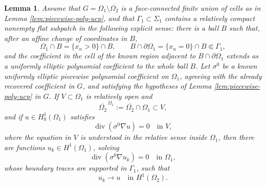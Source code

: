 \documentclass[11pt,oneside]{article}
\newtheorem{lemma}[theorem]{Lemma}
\newcommand{\diver}{\operatorname{div}}
\begin{document}
\begin{lemma}
\label{lem:runge-known-shell}
Assume that \(G=\Omega_1\setminus\overline{\Omega_2}\) is a face-connected
finite union of cells as in Lemma \ref{lem:piecewise-poly-ucp}, and that
\(\Gamma_1\subset\Sigma_1\) contains a relatively compact nonempty flat
subpatch in the following explicit sense: there is a ball \(B\) such that,
after an affine change of coordinates in \(B\),
\begin{equation}
  \Omega_1\cap B=\{x_n>0\}\cap B,
  \qquad
  B\cap\partial\Omega_1=\{x_n=0\}\cap B\Subset \Gamma_1,
\end{equation}
and the coefficient in the cell of the known region adjacent to \(B\cap\partial\Omega_1\)
extends as a uniformly elliptic polynomial coefficient to the whole ball
\(B\).  Let \(\sigma^0\) be a known
uniformly elliptic piecewise polynomial coefficient on \(\Omega_1\), agreeing
with the already recovered coefficient in \(G\), and satisfying the hypotheses
of Lemma \ref{lem:piecewise-poly-ucp} in \(G\).  If
\(V\subset\Omega_1\) is relatively open and
\begin{equation}
  \overline{\Omega_2}^{\,\Omega_1}:=\overline{\Omega_2}\cap\Omega_1
  \subset V,
\end{equation}
and if \(u\in H^1_0(\Omega_1)\) satisfies
\begin{equation}
  \diver(\sigma^0\nabla u)=0\quad\text{in }V,
\end{equation}
where the equation in \(V\) is understood in the relative sense inside
\(\Omega_1\), then there are functions \(u_k\in H^1(\Omega_1)\), solving
\begin{equation}
  \diver(\sigma^0\nabla u_k)=0\quad\text{in }\Omega_1,
\end{equation}
whose boundary traces are supported in \(\Gamma_1\), such that
\begin{equation}
  u_k\to u\quad\text{in }H^1(\Omega_2).
\end{equation}
\end{lemma}
\end{document}
